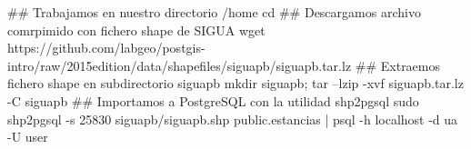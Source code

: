 \lstset{caption=Importación de estancias,label=bash:importarEstancias}
\begin{bash}
## Trabajamos en nuestro directorio /home
cd
## Descargamos archivo comrpimido con fichero shape de SIGUA
wget https://github.com/labgeo/postgis-intro/raw/2015edition/data/shapefiles/siguapb/siguapb.tar.lz
## Extraemos fichero shape en subdirectorio siguapb
mkdir siguapb; tar --lzip -xvf siguapb.tar.lz -C siguapb
## Importamos a PostgreSQL con la utilidad shp2pgsql
sudo shp2pgsql -s 25830 siguapb/siguapb.shp public.estancias  | psql -h localhost -d ua -U user
\end{bash}
